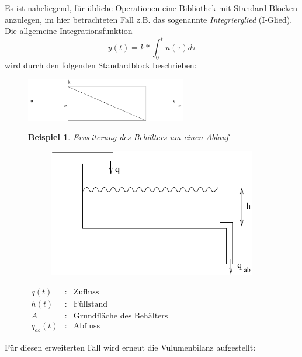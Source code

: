 \message{ !name(Mitschrieb_SysRegel.tex)}\documentclass[12pt,a4paper,ngerman]{scrartcl}
\newtheorem{bsp}{Beispiel}[section] %
\begin{document}
Es ist naheliegend, für übliche Operationen eine Bibliothek mit Standard-Blöcken anzulegen, im hier betrachteten Fall z.B. das sogenannte \emph{Integrierglied} (I-Glied).
Die allgemeine Integrationsfunktion
\begin{equation*}
  y(t)=k*\int_0^t{u(\tau)d\tau}
\end{equation*}
wird durch den folgenden Standardblock beschrieben:
\begin{figure}[H]
  \includegraphics[width=7cm]{sysregel_iglied}
\end{figure}
\begin{figure}[H]
\begin{bsp}
Erweiterung des Behälters um einen Ablauf
\end{bsp}

\begin{minipage}{0.4\linewidth}
\begin{figure}[H]
  \includegraphics[width=.9\linewidth]{sysregel_bsp_2}  
\end{figure}
\end{minipage}
\begin{minipage}{0.6\linewidth}
$\begin{array}{lll}
q(t)&:&\text{Zufluss}\\
h(t)&:&\text{Füllstand}\\
A&:&\text{Grundfläche des Behälters}\\
q_{ab}(t)&:&\text{Abfluss}
\end{array}$
\end{minipage}
\end{figure}
Für diesen erweiterten Fall wird erneut die Vulumenbilanz aufgestellt:
\end{document}
